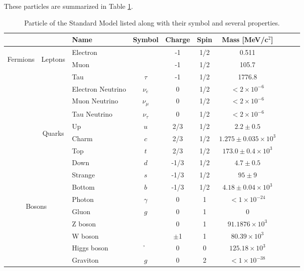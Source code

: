 These particles are summarized in Table \ref{tab:particles}.

\begin{table}[htp]
\begin{center}
\caption{Particle of the Standard Model listed along with their symbol and several properties.}
{\footnotesize
\begin{tabular}{c c l c c c c c c c}
\toprule
& & Name & Symbol & Charge & Spin & Mass [MeV/c$^2$] \\
\midrule
\multirow{12}{*}[0em]{\begin{sideways}Fermions\end{sideways}} & \multirow{6}{*}[0em]{\begin{sideways}Leptons\end{sideways}} & Electron & \e & -1 & 1/2 & 0.511 \\
& & Muon   			  & \m         & -1 & 1/2 & 105.7 \\
& & Tau    			  & $\tau$     & -1 & 1/2 & 1776.8 \\
& & Electron Neutrino & $\nu_e$    & 0  & 1/2 &  $<2\times10^{-6}$\\
& & Muon Neutrino     & $\nu_\mu$  & 0  & 1/2 &  $<2\times10^{-6}$\\
& & Tau Neutrino      & $\nu_\tau$ & 0  & 1/2 &  $<2\times10^{-6}$\\
\cline{2-7} 
& \multirow{6}{*}[0em]{\begin{sideways}Quarks\end{sideways}} & Up & $u$ & 2/3 & 1/2 &  $2.2\pm0.5$ \\
& & Charm             & $c$ &  2/3 & 1/2 &  $1.275\pm0.035\times10^{3}$ \\
& & Top               & $t$ &  2/3 & 1/2 &  $173.0\pm0.4\times10^{3}$ \\
& & Down              & $d$ & -1/3 & 1/2 &  $4.7\pm0.5$ \\
& & Strange           & $s$ & -1/3 & 1/2 &  $95\pm9$ \\
& & Bottom            & $b$ & -1/3 & 1/2 &  $4.18\pm0.04\times10^{3}$ \\
\midrule
\multicolumn{2}{c}{\multirow{6}{*}[0em]{\begin{sideways}Bosons\end{sideways}}} & Photon & $\gamma$ & 0 & 1 & $<1\times10^{-24}$ \\
& & Gluon         & $g$ & 0 & 1 & 0 \\
& & Z boson       & \Z  & 0 & 1 & $91.1876\times 10^3$ \\
& & W boson       & \W  & $\pm$1 & 1 & $80.39\times 10^3$ \\
& & Higgs boson   & \h  & 0 & 0 & $125.18\times 10^3$ \\
& & Graviton      & $g$ & 0 & 2 & $<1\times 10^{-38}$ \\
\bottomrule
\end{tabular}
}
\label{tab:particles}
\end{center}
\end{table}

